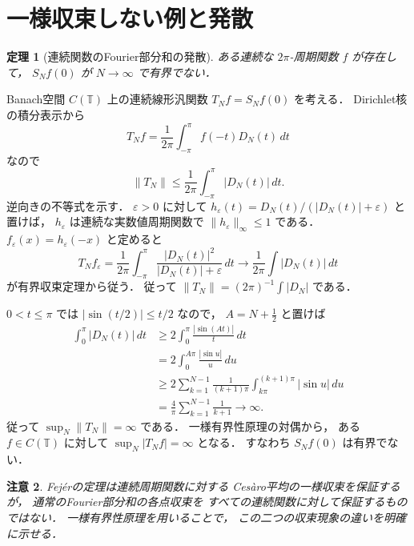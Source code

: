 \documentclass[a5paper,10pt,onecolumn]{jsarticle}
\makeatletter
\theoremstyle{mathnotetheorem}
\newtheorem{theorem}{定理}[section]
\newtheorem{remark}[theorem]{注意}
\renewcommand{\proofname}{証明}
\renewenvironment{proof}[1][\proofname]{%
  \par\pushQED{\qed}\normalfont\topsep4\p@\@plus2\p@\relax
  \trivlist\item[\hskip\labelsep\bfseries #1]\ignorespaces
}{\popQED\endtrivlist\@endpefalse}
\newcommand{\norm}[1]{\lVert #1\rVert}
\makeatother
\begin{document}
\section{一様収束しない例と発散}

\begin{theorem}[連続関数のFourier部分和の発散]\label{thm:divergence}
ある連続な $2\pi$-周期関数 $f$ が存在して，
$S_Nf(0)$ が $N\to\infty$ で有界でない．
\end{theorem}
\begin{proof}
Banach空間 $C(\mathbb T)$ 上の連続線形汎関数
$T_Nf=S_Nf(0)$ を考える．
Dirichlet核の積分表示から
\[
 T_Nf=\frac1{2\pi}\int_{-\pi}^\pi f(-t)D_N(t)\,dt
\]
なので
\[
 \norm{T_N}\le\frac1{2\pi}\int_{-\pi}^\pi|D_N(t)|\,dt.
\]
逆向きの不等式を示す．
$\varepsilon>0$ に対して
$h_\varepsilon(t)=D_N(t)/(|D_N(t)|+\varepsilon)$ と置けば，
$h_\varepsilon$ は連続な実数値周期関数で
$\norm{h_\varepsilon}_\infty\le1$ である．
$f_\varepsilon(x)=h_\varepsilon(-x)$ と定めると
\[
 T_Nf_\varepsilon
 =\frac1{2\pi}\int_{-\pi}^\pi
   \frac{|D_N(t)|^2}{|D_N(t)|+\varepsilon}\,dt
 \longrightarrow\frac1{2\pi}\int|D_N(t)|\,dt
\]
が有界収束定理から従う．
従って
$\norm{T_N}=(2\pi)^{-1}\int|D_N|$ である．

$0<t\le\pi$ では
$|\sin(t/2)|\le t/2$ なので，
$A=N+\frac12$ と置けば
\begin{align*}
 \int_0^\pi|D_N(t)|\,dt
 &\ge2\int_0^\pi\frac{|\sin(At)|}{t}\,dt\\
 &=2\int_0^{A\pi}\frac{|\sin u|}{u}\,du\\
 &\ge2\sum_{k=1}^{N-1}
     \frac1{(k+1)\pi}\int_{k\pi}^{(k+1)\pi}|\sin u|\,du\\
 &=\frac4\pi\sum_{k=1}^{N-1}\frac1{k+1}
 \longrightarrow\infty.
\end{align*}
従って $\sup_N\norm{T_N}=\infty$ である．
一様有界性原理の対偶から，
ある $f\in C(\mathbb T)$ に対して
$\sup_N|T_Nf|=\infty$ となる．
すなわち $S_Nf(0)$ は有界でない．
\end{proof}

\begin{remark}
Fej\'erの定理は連続周期関数に対する
Ces\`aro平均の一様収束を保証するが，
通常のFourier部分和の各点収束を
すべての連続関数に対して保証するものではない．
一様有界性原理を用いることで，
この二つの収束現象の違いを明確に示せる．
\end{remark}
\end{document}

